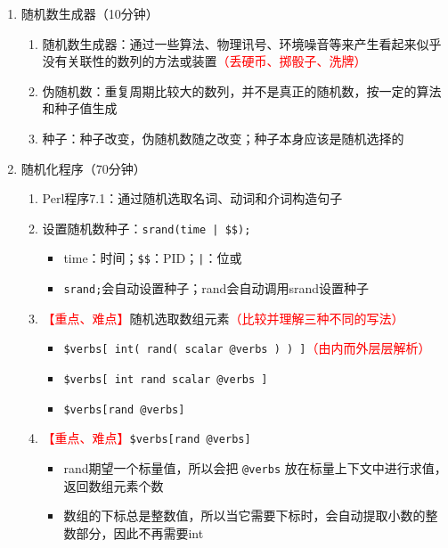 \documentclass{TIJMUjiaoanLL}
\begin{document}
\begin{enumerate}
\begin{enumerate}
    \end{enumerate}
  \item 随机数生成器（10分钟）
    \begin{enumerate}
      \item 随机数生成器：通过一些算法、物理讯号、环境噪音等来产生看起来似乎没有关联性的数列的方法或装置\textcolor{red}{（丢硬币、掷骰子、洗牌）}
      \item 伪随机数：重复周期比较大的数列，并不是真正的随机数，按一定的算法和种子值生成
      \item 种子：种子改变，伪随机数随之改变；种子本身应该是随机选择的
    \end{enumerate}
  \item 随机化程序（70分钟）
    \begin{enumerate}
      \item Perl程序7.1：通过随机选取名词、动词和介词构造句子
      \item 设置随机数种子：\verb=srand(time | $$);=
	\begin{itemize}
	  \item time：时间；\verb|$$|：PID；\verb=|=：位或
	  \item \verb|srand;|会自动设置种子；rand会自动调用srand设置种子
	\end{itemize}
      \item \textcolor{red}{【重点、难点】}随机选取数组元素\textcolor{red}{（比较并理解三种不同的写法）}
	\begin{itemize}
	  \item \verb|$verbs[ int( rand( scalar @verbs ) ) ]|\textcolor{red}{（由内而外层层解析）}
	  \item \verb|$verbs[ int rand scalar @verbs ]|
	  \item \verb|$verbs[rand @verbs]|
	\end{itemize}
      \item \textcolor{red}{【重点、难点】}\verb|$verbs[rand @verbs]|
	\begin{itemize}
	  \item rand期望一个标量值，所以会把 \verb|@verbs| 放在标量上下文中进行求值，返回数组元素个数
	  \item 数组的下标总是整数值，所以当它需要下标时，会自动提取小数的整数部分，因此不再需要int
	\end{itemize}
    \end{enumerate}

\otherTail
\newpage
\otherHeader


\end{enumerate}
\end{document}
